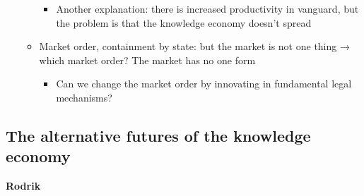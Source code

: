 \begin{itemize}
\begin{itemize}
    \begin{itemize}
    \tightlist
    \item
      Another explanation: there is increased productivity in vanguard,
      but the problem is that the knowledge economy doesn't spread
    \end{itemize}
  \item
    Market order, containment by state: but the market is not one thing
    → which market order? The market has no one form

    \begin{itemize}
    \tightlist
    \item
      Can we change the market order by innovating in fundamental legal
      mechanisms?
    \end{itemize}
  \end{itemize}
\end{itemize}

\hypertarget{the-alternative-futures-of-the-knowledge-economy}{%
\subsection{The alternative futures of the knowledge
economy}\label{the-alternative-futures-of-the-knowledge-economy}}

\textbf{Rodrik}

